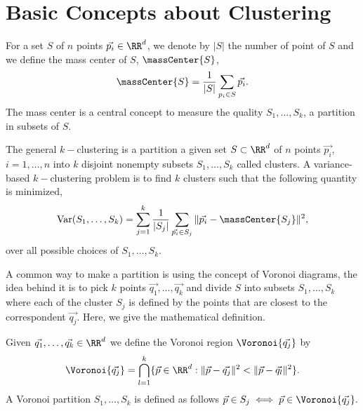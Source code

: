 \section{Basic Concepts about Clustering}
\label{sec:BasicConceptsClustering}
For a set $S$ of $n$ points $\vec{p_i}\in \RR^d$, we denote by $|S|$ the number
of point of $S$ and we define the mass center of $S$, $\massCenter{S}$,
\begin{equation*}
  \massCenter{S}=\frac{1}{|S|}\sum_{p_i\in S} \vec{p_i}.
\end{equation*}
The mass center is a central concept to measure the quality
$S_1,\ldots, S_k$, a partition in subsets of $S$.
\begin{definition}
  The general $k-$clustering is a partition a given set $S\subset\RR^{d}$
  of $n$ points $\vec{p_i}$, $i=1,\ldots, n$ into $k$ disjoint nonempty subsets
  $S_1,\ldots, S_k$ called clusters. A variance-based $k-$clustering problem 
  is to find $k$ clusters such that the following quantity is minimized,
  \begin{equation*}
    \text{Var}(S_1,\ldots, S_k)=\sum_{j=1}^{k}\frac{1}{|S_j|}
    \sum_{\vec{p_i}\in S_j}\|\vec{p_i}-\massCenter{S_j}\|^2,
  \end{equation*}
  over all possible choices of $S_1,\ldots, S_k$.
\end{definition}
A common way to make a partition is using the concept of Voronoi diagrams, the idea
behind it is to pick $k$ points $\vec{q_1},\ldots, \vec{q_k}$ and divide $S$ into 
subsets $S_1,\ldots, S_k$ where each of the cluster $S_j$  is defined by 
the points that are closest to the correspondent $\vec{q_j}$. Here, we give the 
mathematical definition.
\begin{definition}
  Given $\vec{q_1},\ldots,\vec{q_k}\in\RR^{d}$ we define the Voronoi region
  $\Voronoi{\vec{q_j}}$ by
  \begin{equation*}
    \Voronoi{\vec{q_j}}=\bigcap_{l=1}^{k}\{\vec{p}\in\RR^d : 
    \|\vec{p}-\vec{q_j}\|^2< \|\vec{p}-\vec{q_l}\|^2\}.
  \end{equation*}
  A Voronoi partition $S_1,\ldots, S_k$ is defined as follows $\vec{p}\in S_{j}\iff 
  \vec{p}\in\Voronoi{\vec{q_j}}.$
\end{definition}


